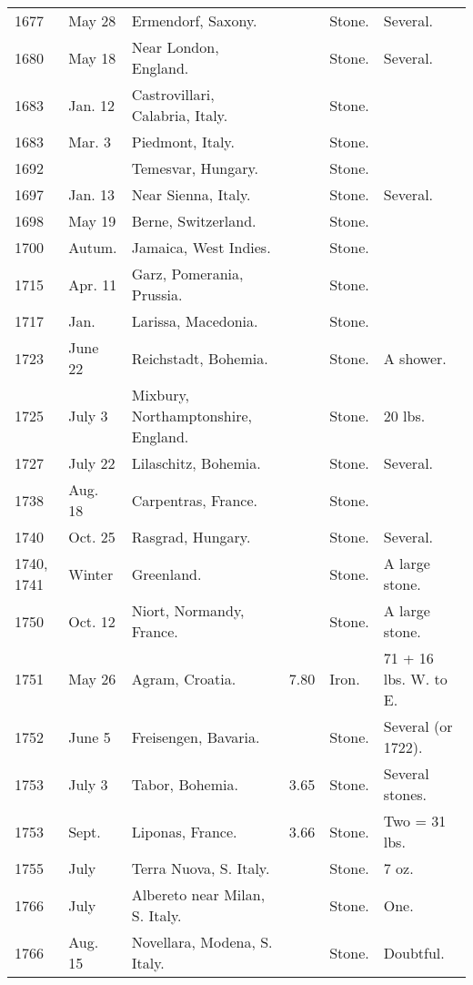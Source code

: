 \documentclass[a4paper, 12pt, oneside]{article}
\begin{document}
\begin{center}
\begin{longtable}{|p{10mm}|p{15mm}|p{32mm}|p{13mm}|p{13mm}|p{26mm}|}
        1677 & May 28 & Ermendorf, Saxony. & ~ & Stone. & Several. \\
        1680 & May 18 & Near London, England. & ~ & Stone. & Several. \\
        1683 & Jan. 12 & Castrovillari, Calabria, Italy. & ~ & Stone. & ~ \\
        1683 & Mar. 3 & Piedmont, Italy. & ~ & Stone. & ~ \\
        1692 & ~ & Temesvar, Hungary. & ~ & Stone. & ~ \\
        1697 & Jan. 13 & Near Sienna, Italy. & ~ & Stone. & Several. \\
        1698 & May 19 & Berne, Switzerland. & ~ & Stone. & ~ \\
        1700 & Autum. & Jamaica, West Indies. & ~ & Stone. & ~ \\
        1715 & Apr. 11 & Garz, Pomerania, Prussia. & ~ & Stone. & ~ \\
        1717 & Jan. & Larissa, Macedonia. & ~ & Stone. & ~ \\
        1723 & June 22 & Reichstadt, Bohemia. & ~ & Stone. & A shower. \\
        1725 & July 3 & Mixbury, Northamptonshire, England. & ~ & Stone. & 20 lbs. \\
        1727 & July 22 & Lilaschitz, Bohemia. & ~ & Stone. & Several. \\
        1738 & Aug. 18 & Carpentras, France. & ~ & Stone. & ~ \\
        1740 & Oct. 25 & Rasgrad, Hungary. & ~ & Stone. & Several. \\
        1740, 1741 & Winter & Greenland. & ~ & Stone. & A large stone. \\
        1750 & Oct. 12 & Niort, Normandy, France. & ~ & Stone. & A large stone. \\
        1751 & May 26 & Agram, Croatia. & 7.80 & Iron. & 71 + 16 lbs. W. to E. \\
        1752 & June 5 & Freisengen, Bavaria. & ~ & Stone. & Several (or 1722). \\
        1753 & July 3 & Tabor, Bohemia. & 3.65 & Stone. & Several stones. \\
        1753 & Sept. & Liponas, France. & 3.66 & Stone. & Two = 31 lbs. \\
        1755 & July & Terra Nuova, S. Italy. & ~ & Stone. & 7 oz. \\
        1766 & July & Albereto near Milan, S. Italy. & ~ & Stone. & One. \\
        1766 & Aug. 15 & Novellara, Modena, S. Italy. & ~ & Stone. & Doubtful. \\

\end{longtable}
\end{center}
\end{document}
